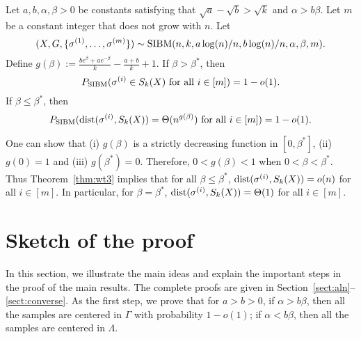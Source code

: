 \documentclass{article}
\begin{document}
\begin{theorem}  \label{thm:wt3}
Let $a,b,\alpha,\beta> 0$ be constants satisfying that $\sqrt{a}-\sqrt{b} > \sqrt{k}$ and $\alpha>b\beta$. Let $m$ be a constant integer that does not grow with $n$.
Let 
$$
(X,G,\{\sigma^{(1)},\dots,\sigma^{(m)}\}) \sim \operatorname{SIBM}(n,k, a\log(n)/n, b\log(n)/n,\alpha,\beta,m).
$$
Define $g(\beta)  := \frac{b e^{\beta}+a e^{-\beta}}{k}-\frac{a+b}{k}+1$.
If $\beta>\beta^\ast$, then
$$
P_{\operatorname{SIBM}}(\sigma^{(i)} \in S_k(X) \text{~for all~} i\in[m]) = 1-o(1).
$$
If $\beta\le \beta^\ast$, then
$$
P_{\operatorname{SIBM}}(\operatorname{dist}(\sigma^{(i)}, S_k(X))= \Theta(n^{g(\beta)}) \text{~for all~} i\in[m]) = 1-o(1) .
$$
\end{theorem}
One can show that (i) $g(\beta)$ is a strictly decreasing function in $[0,\beta^\ast]$, (ii) $g(0)=1$ and (iii) $g(\beta^\ast)=0$. Therefore, $0<g(\beta)<1$ when $0<\beta<\beta^\ast$. Thus Theorem~\ref{thm:wt3} implies that for all $\beta\le \beta^\ast$, $\operatorname{dist}(\sigma^{(i)},S_k(X))=o(n)$ for all $i\in[m]$. In particular, for $\beta = \beta^\ast$, $\operatorname{dist}(\sigma^{(i)},S_k(X))=\Theta(1)$ for all $i\in[m]$.
\section{Sketch of the proof}
\label{sect:sketch}

In this section, we illustrate the main ideas and explain the important steps in the proof of the main results. The complete proofs are given in Section~\ref{sect:aln}--\ref{sect:converse}.
As the first step, we prove that for $a>b>0$, if $\alpha>b\beta$, then all the samples are centered in $\Gamma$ with probability $1-o(1)$; if $\alpha<b\beta$, then all the samples are centered in $\Lambda$.
\end{document}
